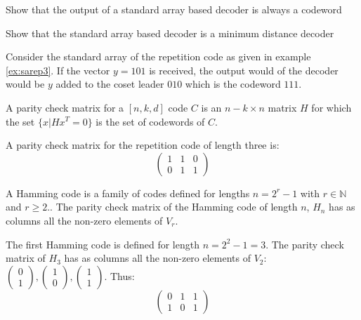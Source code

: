 \begin{exercise}
\label{ex:sadec1}
Show that the output of a standard array based decoder is always a codeword
\end{exercise}
\begin{exercise}
Show that the standard array based decoder is a minimum distance decoder
\label{ex:sadec2}
\end{exercise}
\begin{example}
Consider the standard array of the repetition code as given in example \ref{ex:sarep3}. If the vector $y=101$ is received, the output would of the decoder would be $y$ added to the coset leader $010$ which is the codeword $111$.
\end{example}
\begin{definition}
A parity check matrix for a $[n,k,d]$ code $C$ is an $n-k\times n$ matrix $H$ for which the set $\{x|Hx^T=0\}$ is the set of codewords of $C$.
\end{definition}
\begin{example}
A parity check matrix for the repetition code of length three is:
\begin{equation}
\begin{pmatrix}
1&1&0\\
0&1&1
\end{pmatrix}
\end{equation}
\end{example}
A Hamming code is a family of codes defined for lengths $n=2^r-1$ with $r\in\mathbb N$ and $r\geq 2$.. The parity check matrix of the Hamming code of length $n$, $H_n$ has as columns all the non-zero elements of $V_r$.
\begin{example}
The first Hamming code is defined for length $n=2^2-1=3$. The parity check matrix of $H_3$ has as columns all the non-zero elements of $V_2$: $\begin{pmatrix}0\\1\end{pmatrix},\begin{pmatrix}1\\0\end{pmatrix},\begin{pmatrix}1\\1\end{pmatrix}$. Thus:
\begin{equation}
\begin{pmatrix}
0&1&1\\
1&0&1
\end{pmatrix}
\end{equation}
\end{example}
